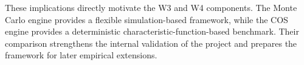These implications directly motivate the W3 and W4 components. The Monte Carlo engine provides a flexible simulation-based framework, while the COS engine provides a deterministic characteristic-function-based benchmark. Their comparison strengthens the internal validation of the project and prepares the framework for later empirical extensions. 